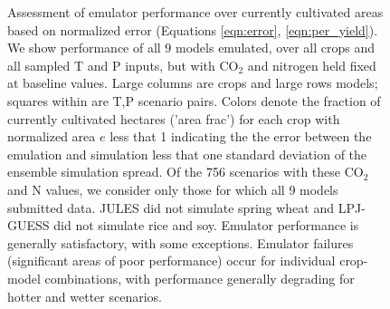 \documentclass[preprint, 5p, times, twocolumn]{elsarticle}
\begin{document}
\begin{figure}[!p]
    \caption{Assessment of emulator performance over currently cultivated areas based on normalized error (Equations \ref{eqn:error}, \ref{eqn:per_yield}). We show performance of all 9 models emulated, over all crops and all sampled T and P inputs, but with CO$_2$ and nitrogen held fixed at baseline values. Large columns are crops and large rows models; squares within are T,P scenario pairs. Colors denote the fraction of currently cultivated hectares ('area frac') for each crop with normalized area $e$ less that 1 indicating the the error between the emulation and simulation less that one standard deviation of the ensemble simulation spread. Of the 756 scenarios with these CO$_2$ and N values, we consider only those for which all 9 models submitted data. JULES did not simulate spring wheat and LPJ-GUESS did not simulate rice and soy. Emulator performance is generally satisfactory, with some exceptions. Emulator failures (significant areas of poor performance) occur for individual crop-model combinations, with performance generally degrading for hotter and wetter scenarios.}
   \label{fig:error_360}
\end{figure}
\end{document}
